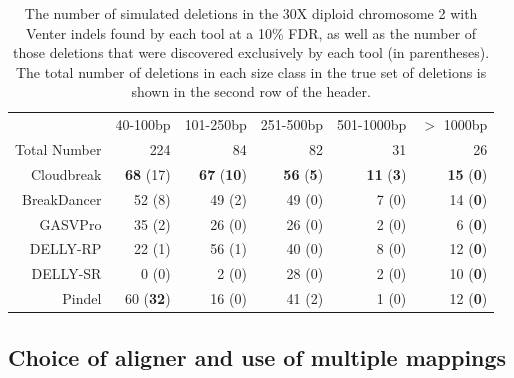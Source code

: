 \begin{table}
\begin{center}
\begin{tabular}{rrrrrr}
 \hline
 & 40-100bp & 101-250bp & 251-500bp & 501-1000bp & $>$ 1000bp \\ 
 Total Number & 224 & 84 & 82 & 31 & 26\\ 
 \hline
 Cloudbreak & \textbf{68} (17) & \textbf{67} (\textbf{10}) & \textbf{56} (\textbf{5}) & \textbf{11} (\textbf{3}) & \textbf{15} (\textbf{0}) \\ 
 BreakDancer & 52 (8) & 49 (2) & 49 (0) & 7 (0) & 14 (\textbf{0}) \\ 
 GASVPro  & 35 (2) & 26 (0) & 26 (0) & 2 (0) & 6 (\textbf{0}) \\ 
 DELLY-RP  & 22 (1) & 56 (1) & 40 (0) & 8 (0) & 12 (\textbf{0}) \\ 
 DELLY-SR  & 0 (0) & 2 (0) & 28 (0) & 2 (0) & 10 (\textbf{0}) \\ 
 Pindel  & 60 (\textbf{32}) & 16 (0) & 41 (2) & 1 (0) & 12 (\textbf{0})\\ 
 \hline
\end{tabular}
\end{center}
\caption{The number of simulated deletions in the 30X diploid chromosome 2 with Venter indels found by each tool at a 10\% FDR, as well as the number of those deletions that were discovered exclusively by each tool (in parentheses). The total number of deletions in each size class in the true set of deletions is shown in the second row of the header.}
\label{chr2DeletionPredsFDR10}
\end{table}

\subsection{Choice of aligner and use of multiple mappings}

